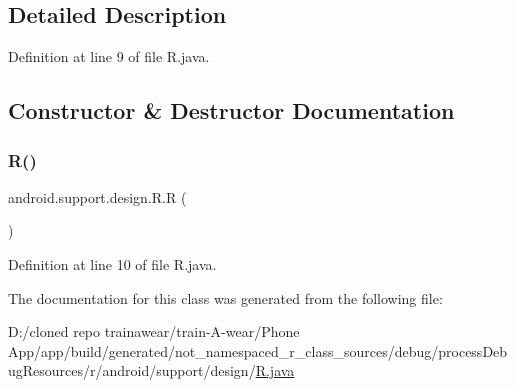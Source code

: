 \subsection{Detailed Description}


Definition at line 9 of file R.\+java.



\subsection{Constructor \& Destructor Documentation}
\mbox{\label{classandroid_1_1support_1_1design_1_1_r_ad1e86357443b87d6815db644f01672a1}} 
\subsubsection{\texorpdfstring{R()}{R()}}
{\footnotesize\ttfamily android.\+support.\+design.\+R.\+R (\begin{DoxyParamCaption}{ }\end{DoxyParamCaption})\hspace{0.3cm}{\ttfamily [private]}}



Definition at line 10 of file R.\+java.


\begin{DoxyCode}{0}

\end{DoxyCode}


The documentation for this class was generated from the following file\+:\begin{DoxyCompactItemize}
\item 
D\+:/cloned repo trainawear/train-\/\+A-\/wear/\+Phone App/app/build/generated/not\+\_\+namespaced\+\_\+r\+\_\+class\+\_\+sources/debug/process\+Debug\+Resources/r/android/support/design/\mbox{\hyperlink{process_debug_resources_2r_2android_2support_2design_2_r_8java}{R.\+java}}\end{DoxyCompactItemize}
